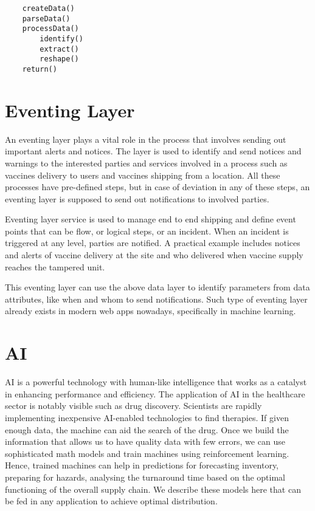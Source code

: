 \documentclass{article}
\begin{document}
\begin{lstlisting}
	createData()
	parseData()
	processData()
		identify()
		extract()
		reshape()
	return()	
\end{lstlisting}

   
\section{Eventing Layer}

An eventing layer plays a vital role in the process that involves sending out important alerts and notices. The layer is used to identify and send notices and warnings to the interested parties and services involved in a process such as vaccines delivery to users and vaccines shipping from a location. All these processes have pre-defined steps, but in case of deviation in any of these steps, an eventing layer is supposed to send out notifications to involved parties.

Eventing layer service is used to manage end to end shipping and define event points that can be flow, or logical steps, or an incident. When an incident is triggered at any level, parties are notified. A practical example includes notices and alerts of vaccine delivery at the site and who delivered when vaccine supply reaches the tampered unit.

This eventing layer can use the above data layer to identify parameters from data attributes, like when and whom to send notifications. Such type of eventing layer already exists in modern web apps nowadays, specifically in machine learning.

\section{AI}
AI is a powerful technology with human-like intelligence that works as a catalyst in enhancing performance and efficiency. The application of AI in the healthcare sector is notably visible such as drug discovery. Scientists are rapidly implementing inexpensive AI-enabled technologies to find therapies. If given enough data, the machine can aid the search of the drug\cite{keshavarzi2020artificial}. Once we build the information that allows us to have quality data with few errors, we can use sophisticated math models and train machines using reinforcement learning. Hence, trained machines can help in predictions for forecasting inventory, preparing for hazards, analysing the turnaround time based on the optimal functioning of the overall supply chain. We describe these models here that can be fed in any application to achieve optimal distribution.
\end{document}
